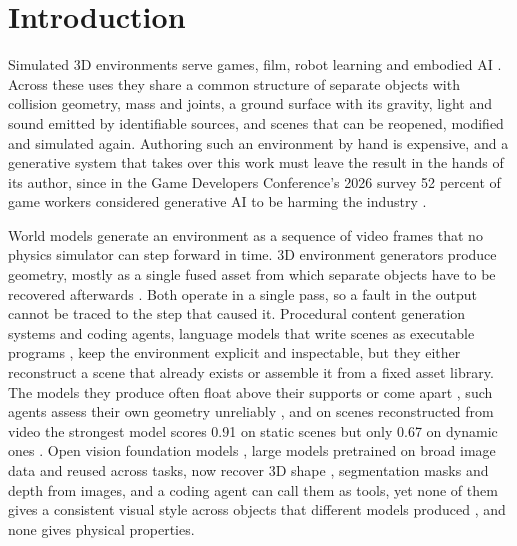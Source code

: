 \section{Introduction}\label{introduction}

Simulated 3D environments serve games, film, robot learning and embodied AI \citep{yang2024holodeck}. Across these uses they share a common structure of separate objects with collision geometry, mass and joints, a ground surface with its gravity, light and sound emitted by identifiable sources, and scenes that can be reopened, modified and simulated again. Authoring such an environment by hand is expensive, and a generative system that takes over this work must leave the result in the hands of its author, since in the Game Developers Conference's 2026 survey 52 percent of game workers considered generative AI to be harming the industry \citep{gdc2026survey}.

World models generate an environment as a sequence of video frames \citep{bruce2024genie, genie3} that no physics simulator can step forward in time. 3D environment generators \citep{wang2025worldgen, hyworld2} produce geometry, mostly as a single fused asset from which separate objects have to be recovered afterwards \citep{hu2026worldact, niu2026worldsculpt}. Both operate in a single pass, so a fault in the output cannot be traced to the step that caused it. Procedural content generation systems \citep{raistrick2023infinigen, raistrick2024indoors} and coding agents, language models that write scenes as executable programs \citep{hu2024scenecraft, li2026rcwm, guo2026worldclaw, yin2026autoue, he2026thinking, wang2026codeasworlds}, keep the environment explicit and inspectable, but they either reconstruct a scene that already exists or assemble it from a fixed asset library. The models they produce often float above their supports or come apart \citep{gao2026codebench3d}, such agents assess their own geometry unreliably \citep{li2026lego}, and on scenes reconstructed from video the strongest model scores 0.91 on static scenes but only 0.67 on dynamic ones \citep{shen2026codebench4d}. Open vision foundation models \citep{oquab2023dinov2}, large models pretrained on broad image data and reused across tasks, now recover 3D shape \citep{li2026pixal3d}, segmentation masks \citep{carion2025sam3} and depth \citep{wang2025moge2} from images, and a coding agent can call them as tools, yet none of them gives a consistent visual style across objects that different models produced \citep{wu2026production, yang2026flowscene}, and none gives physical properties.


